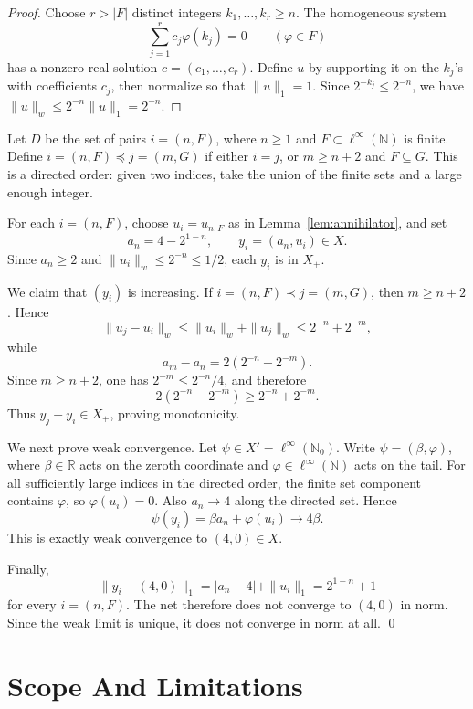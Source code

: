 \documentclass[11pt]{article}
\begin{document}
\begin{proof}
Choose \(r>|F|\) distinct integers \(k_1,\ldots,k_r\geq n\).  The homogeneous
system
\[
  \sum_{j=1}^r c_j\varphi(k_j)=0\qquad(\varphi\in F)
\]
has a nonzero real solution \(c=(c_1,\ldots,c_r)\).  Define \(u\) by
supporting it on the \(k_j\)'s with coefficients \(c_j\), then normalize so
that \(\|u\|_1=1\).  Since \(2^{-k_j}\leq2^{-n}\), we have
\(\|u\|_w\leq2^{-n}\|u\|_1=2^{-n}\).
\end{proof}

Let \(D\) be the set of pairs \(i=(n,F)\), where \(n\geq1\) and
\(F\subset\ell^\infty(\mathbb N)\) is finite.  Define \(i=(n,F)\preceq
j=(m,G)\) if either \(i=j\), or \(m\geq n+2\) and \(F\subseteq G\).  This is a
directed order: given two indices, take the union of the finite sets and a
large enough integer.

For each \(i=(n,F)\), choose \(u_i=u_{n,F}\) as in
Lemma~\ref{lem:annihilator}, and set
\[
  a_n=4-2^{1-n},\qquad y_i=(a_n,u_i)\in X.
\]
Since \(a_n\geq2\) and \(\|u_i\|_w\leq2^{-n}\leq1/2\), each \(y_i\) is in
\(X_+\).

We claim that \((y_i)\) is increasing.  If \(i=(n,F)\prec j=(m,G)\), then
\(m\geq n+2\).  Hence
\[
  \|u_j-u_i\|_w\leq \|u_i\|_w+\|u_j\|_w\leq 2^{-n}+2^{-m},
\]
while
\[
  a_m-a_n=2(2^{-n}-2^{-m}).
\]
Since \(m\geq n+2\), one has \(2^{-m}\leq 2^{-n}/4\), and therefore
\[
  2(2^{-n}-2^{-m})\geq 2^{-n}+2^{-m}.
\]
Thus \(y_j-y_i\in X_+\), proving monotonicity.

We next prove weak convergence.  Let \(\psi\in X'=\ell^\infty(\mathbb N_0)\).
Write \(\psi=(\beta,\varphi)\), where \(\beta\in\mathbb R\) acts on the
zeroth coordinate and \(\varphi\in\ell^\infty(\mathbb N)\) acts on the tail.
For all sufficiently large indices in the directed order, the finite set
component contains \(\varphi\), so \(\varphi(u_i)=0\).  Also \(a_n\to4\) along
the directed set.  Hence
\[
  \psi(y_i)=\beta a_n+\varphi(u_i)\longrightarrow 4\beta.
\]
This is exactly weak convergence to \((4,0)\in X\).

Finally,
\[
  \|y_i-(4,0)\|_1
  = |a_n-4|+\|u_i\|_1
  = 2^{1-n}+1
\]
for every \(i=(n,F)\).  The net therefore does not converge to \((4,0)\) in
norm.  Since the weak limit is unique, it does not converge in norm at all.
\qed

\section*{Scope And Limitations}
\end{document}
